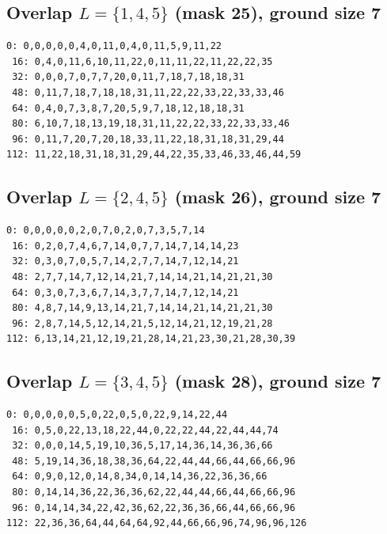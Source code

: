 \documentclass[11pt]{article}
\begin{document}
\subsection*{Overlap $L=\{1,4,5\}$ (mask 25), ground size 7}
\begin{Verbatim}[fontsize=\footnotesize]
  0: 0,0,0,0,0,4,0,11,0,4,0,11,5,9,11,22
 16: 0,4,0,11,6,10,11,22,0,11,11,22,11,22,22,35
 32: 0,0,0,7,0,7,7,20,0,11,7,18,7,18,18,31
 48: 0,11,7,18,7,18,18,31,11,22,22,33,22,33,33,46
 64: 0,4,0,7,3,8,7,20,5,9,7,18,12,18,18,31
 80: 6,10,7,18,13,19,18,31,11,22,22,33,22,33,33,46
 96: 0,11,7,20,7,20,18,33,11,22,18,31,18,31,29,44
112: 11,22,18,31,18,31,29,44,22,35,33,46,33,46,44,59
\end{Verbatim}
\subsection*{Overlap $L=\{2,4,5\}$ (mask 26), ground size 7}
\begin{Verbatim}[fontsize=\footnotesize]
  0: 0,0,0,0,0,2,0,7,0,2,0,7,3,5,7,14
 16: 0,2,0,7,4,6,7,14,0,7,7,14,7,14,14,23
 32: 0,3,0,7,0,5,7,14,2,7,7,14,7,12,14,21
 48: 2,7,7,14,7,12,14,21,7,14,14,21,14,21,21,30
 64: 0,3,0,7,3,6,7,14,3,7,7,14,7,12,14,21
 80: 4,8,7,14,9,13,14,21,7,14,14,21,14,21,21,30
 96: 2,8,7,14,5,12,14,21,5,12,14,21,12,19,21,28
112: 6,13,14,21,12,19,21,28,14,21,23,30,21,28,30,39
\end{Verbatim}
\subsection*{Overlap $L=\{3,4,5\}$ (mask 28), ground size 7}
\begin{Verbatim}[fontsize=\footnotesize]
  0: 0,0,0,0,0,5,0,22,0,5,0,22,9,14,22,44
 16: 0,5,0,22,13,18,22,44,0,22,22,44,22,44,44,74
 32: 0,0,0,14,5,19,10,36,5,17,14,36,14,36,36,66
 48: 5,19,14,36,18,38,36,64,22,44,44,66,44,66,66,96
 64: 0,9,0,12,0,14,8,34,0,14,14,36,22,36,36,66
 80: 0,14,14,36,22,36,36,62,22,44,44,66,44,66,66,96
 96: 0,14,14,34,22,42,36,62,22,36,36,66,44,66,66,96
112: 22,36,36,64,44,64,64,92,44,66,66,96,74,96,96,126
\end{Verbatim}
\end{document}
